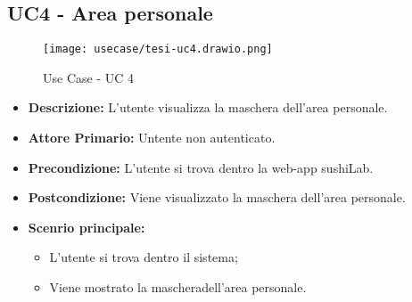 \subsection{UC4 - Area personale}
\begin{figure}[H]
    \centering
    \texttt{[image: usecase/tesi-uc4.drawio.png]}
    \caption{Use Case - UC 4}
\end{figure}
\begin{itemize}
    \item \textbf{Descrizione:} L'utente visualizza la maschera dell'area personale.
    \item \textbf{Attore Primario:} Untente non autenticato.
    \item \textbf{Precondizione:} L'utente si trova dentro la web-app sushiLab.
    \item \textbf{Postcondizione:} Viene visualizzato la maschera dell'area personale.
    \item \textbf{Scenrio principale:}
    \begin{itemize}
        \item L'utente si trova dentro il sistema;
        \item Viene mostrato la mascheradell'area personale.
    \end{itemize}
\end{itemize}
